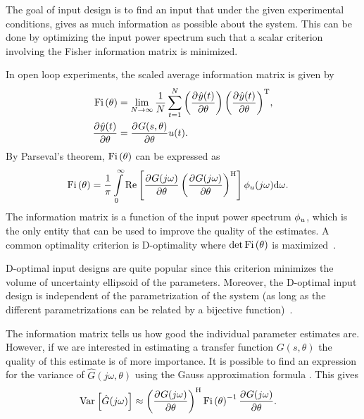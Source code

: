 The goal of input design is to find an input that under the given experimental conditions, gives as much information as possible about the system.
This can be done by optimizing the input power spectrum such that  a scalar criterion involving the Fisher information matrix is minimized.

In open loop experiments, the scaled average information matrix is given by
\begin{align}
\mathrm{Fi} \left(\theta\right) & = \lim_{N\rightarrow\infty}
          \frac{1}{N}
            \sum_{t=1}^{N}
              {\left(\frac{{\partial}^{} \hat{y}(t)}{\partial \theta}\right)
               \left(\frac{{\partial}^{} \hat{y}(t)}{\partial \theta}\right)^{\mathrm{T}}},\\
\frac{{\partial}^{} \hat{y}(t)}{\partial \theta}
    & =\frac{{\partial}^{} G(s,\theta)}{\partial \theta}u(t).
\end{align}
By Parseval's theorem, $\mathrm{Fi} \left(\theta\right)$ can be expressed as
\begin{align}
\mathrm{Fi} \left(\theta\right) &= \frac{1}{\pi}
         \int\limits_0^\infty
        \operatorname{\mathrm{Re}} \left[
                  \frac{{\partial}^{} G(j\omega)}{\partial \theta}
                  \left(\frac{{\partial}^{} G(j\omega)}{\partial \theta}\right)^{\mathrm{H}}
         \right]
           \phi_{u}(j\omega)
           \mathrm{d}{\omega} \text{.}
\label{eq:excitation:IF}
\end{align}
The information matrix is a function of the input power spectrum $\phi_{u}$, which is the only entity that can be used to improve the quality of the estimates. 
A common optimality criterion is D-optimality where $\det{\ensuremath{\mathrm{Fi} \left(\theta\right)}}$ is maximized~\citep{Goodwin1977}.

\begin{remark}
D-optimal input designs are quite popular since this criterion minimizes the volume of uncertainty ellipsoid of the parameters.
Moreover, the D-optimal input design is independent of the parametrization of the system (as long as the different parametrizations can be related by a bijective function)~\citep[Chapter 6]{Goodwin1977}.
\end{remark}

The information matrix tells us how good the individual parameter estimates are. However, if we are interested in estimating a transfer function $G(s,\theta)$ the quality of this estimate is of more importance. 
It is possible to find an expression for the variance of $\hat{G}(j\omega,\theta)$ using the Gauss approximation formula \citep{Ljung1999, Pintelon2012}. This gives
\begin{align}
\operatorname{\mathrm{Var}}_{} \left[ \hat{G}(j\omega) \right] &
  \approx 
  \left(\frac{{\partial}^{} G(j\omega)}{\partial \theta}\right)^{\mathrm{H}}
  \mathrm{Fi} \left(\theta\right)^{-1}
  \frac{{\partial}^{} G(j\omega)}{\partial \theta}
\label{eq:excitation:varG}
\text{.}
\end{align}

